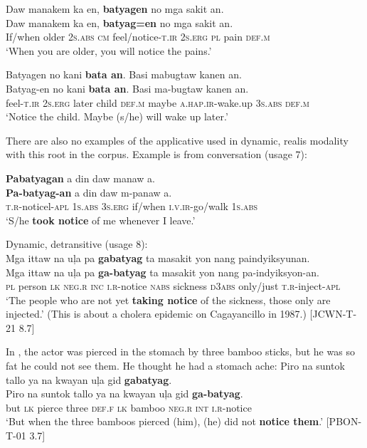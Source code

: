 \ea
\label{ex:noticethepains}
Daw manakem ka en, \textbf{batyagen} no mga sakit an. \\\smallskip
\gll Daw manakem ka en, \textbf{batyag=en} no mga sakit an. \\
If/when	older 2\textsc{s.abs} \textsc{cm} feel/notice-\textsc{t.ir}	2\textsc{s.erg} \textsc{pl} pain \textsc{def.m} \\
\glt `When you are older, you will notice the pains.'
\z

\ea
\label{ex:noticethechild}
Batyagen no kani \textbf{bata an}. Basi mabugtaw kanen an. \\
\gll Batyag-en no kani \textbf{bata an}. Basi ma-bugtaw kanen an. \\
feel-\textsc{t.ir} 2\textsc{s.erg} later child \textsc{def.m} maybe \textsc{a.hap.ir}-wake.up 3\textsc{s.abs} \textsc{def.m} \\
\glt `Notice the child. Maybe (s/he) will wake up later.'
\z

There are also no examples of the applicative used in dynamic, realis modality with this root in the corpus. Example  is from conversation (usage 7):

\ea
\label{bkm:Ref122549938}
\textbf{Pabatyagan}  a  din  daw  manaw  a. \\\smallskip
\gll \textbf{Pa-batyag-an}  a  din  daw  m-panaw  a. \\
\textsc{t.r}-noticel-\textsc{apl}  1\textsc{s.abs}  3\textsc{s.erg}  if/when  \textsc{i.v.ir}-go/walk  1\textsc{s.abs} \\
\glt ‘S/he \textbf{took notice} of me whenever I leave.’
\z

\ea
\label{ex:areinjected}
Dynamic, detransitive (usage 8): \\
Mga  ittaw  na  uļa  pa  \textbf{gabatyag}  ta  masakit  yon  nang paindyiksyunan. \\\smallskip
\gll Mga  ittaw  na  uļa  pa  \textbf{ga-batyag}  ta  masakit  yon  nang pa-indyiksyon-an. \\
\textsc{pl}  person  \textsc{lk}  \textsc{neg.r}  \textsc{inc}  \textsc{i.r}-notice  \textsc{nabs}  sickness  \textsc{d3abs}  only/just \textsc{t.r}-inject-\textsc{apl} \\
\glt `The people who are not yet \textbf{taking notice} of the sickness, those only are injected.’ (This is about a cholera epidemic on Cagayancillo in 1987.)  [JCWN-T-21 8.7]
\z

In , the actor was pierced in the stomach by three bamboo sticks, but he was so fat he could not see them. He thought he had a stomach ache:
\ea
\label{ex:withthebamboo}
Piro  na  suntok  tallo  ya  na  kwayan  uļa  gid  \textbf{gabatyag}. \\\smallskip
\gll Piro  na  suntok  tallo  ya  na  kwayan  uļa  gid  \textbf{ga-batyag}. \\
but  \textsc{lk}  pierce  three  \textsc{def.f}  \textsc{lk}  bamboo  \textsc{neg.r}  \textsc{int}  \textsc{i.r}-notice \\
\glt ‘But when the three bamboos pierced (him), (he) did not \textbf{notice them}.’ [PBON-T-01 3.7]
\z

